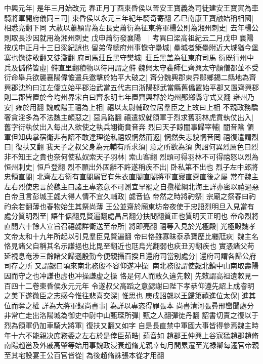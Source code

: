 中興元年|{
	是年三月始改元}
春正月丁酉東昏侯以晉安王寶義為司徒建安王寶寅為車騎將軍開府儀同三司|{
	東昏侯以永元三年紀年騎奇寄翻}
乙巳南康王寶融始稱相國|{
	相悉亮翻下同}
大赦以蕭頴胄為左長史蕭衍為征東將軍楊公則為湘州刺史|{
	去年楊公則取長沙因就用為湘州刺史}
戊申蕭衍發襄陽　|{
	考異曰梁高祖紀云二月戊申襄陽按戊申正月十三日梁紀誤也}
留弟偉總府州事憺守壘城|{
	壘城者築壘附近大城猶今堡寨也憺徒敢翻又徒濫翻}
府司馬莊丘黑守樊城|{
	莊丘黑盖為征東府司馬}
衍既行州中兵及儲偫皆虛|{
	偫直里翻積物以待用謂之偫}
魏興太守裴師仁齊興太守顏僧都並不受衍命舉兵欲襲襄陽偉憺遣兵邀擊於始平大破之|{
	齊分魏興郡東界鄖鄉錫二縣地為齊興郡沈約曰江左僑立始平郡治武當五代志曰浙陽郡武當縣舊僑置始平郡又置齊興郡則二郡皆置於今均州界宋白曰齊永明七年置齊興郡於均州鄖鄉縣守式又翻}
雍州乃安|{
	雍於用翻}
魏咸陽王禧為上相|{
	禧以太尉輔政位居羣臣之上故曰上相}
不親政務驕奢貪淫多為不法魏主頗惡之|{
	惡烏路翻}
禧遣奴就領軍于烈求舊羽林虎賁執仗出入|{
	舊字衍執仗出入每出入欲使之執兵翊衛賁音奔}
烈曰天子諒闇事歸宰輔|{
	闇音陰}
領軍但知典掌宿衛非有詔不敢違理從私禧奴惘然而返|{
	惘然失志貌惘音罔}
禧復遣謂烈曰|{
	復扶又翻}
我天子之叔父身為元輔有所求須|{
	意之所欲為須}
與詔何異烈厲色曰烈非不知王之貴也奈何使私奴索天子羽林|{
	索山客翻}
烈頭可得羽林不可得禧怒以烈為恒州刺史|{
	恒戶登翻}
烈不願出外固辭不許遂稱疾不出|{
	卧私第不出也}
烈子左中郎將忠領直閤|{
	北齊左右衛有直閤屬官有朱衣直閤直閤將軍直寢直齋直後之屬}
常在魏主左右烈使忠言於魏主曰諸王專恣意不可測宜早罷之自攬權綱北海王詳亦密以禧過惡白帝且言彭城王勰大得人情不宜久輔政|{
	勰音協}
帝然之時將礿祭|{
	宗廟之祭春曰礿礿余若翻薄也春物始生其祭尚薄}
王公並齋於廟東坊帝夜使于忠語烈明旦入見當有處分質明烈至|{
	語牛倨翻見賢遍翻處昌呂翻分扶問翻質正也質明天正明也}
帝命烈將直閤六十餘人宣旨召禧勰詳衛送至帝所|{
	將即亮翻}
禧等入見於光極殿|{
	光極殿魏孝文帝太和十九年所起以引見羣臣見賢遍翻}
帝曰恪雖寡昧沗承寶歷比纒尫疢|{
	魏主名恪見諸父自稱其名示謙挹也比毘至翻近也尫烏光翻弱也疢丑刃翻疾也}
實憑諸父苟延視息奄涉三齡諸父歸遜殷勤今便親攝百揆且還府司當别處分|{
	還府司謂各歸公府司存之所}
又謂勰曰頃來南北務殷不容仰遂冲操|{
	南北務殷謂使勰北鎮中山南取壽陽因而守之也冲謙也虚也冲操謙虚之操}
恪是何人而敢久違先敕|{
	先敕謂高祖遺敕見一百四十二卷東昏侯永元元年}
令遂叔父高蹈之意勰謝曰陛下孝恭仰遵先詔上成睿明之美下遂微臣之志感今惟往悲喜交深|{
	惟思也}
庚戌詔勰以王歸第禧進位太保|{
	進其位而奪之權}
詳為大將軍録尚書事|{
	為詳以專恣得罪張本}
尚書清河張彞邢巒聞處分非常亡走出洛陽城為御史中尉中山甄琛所彈|{
	甄之人翻彈徒丹翻}
詔書切責之復以于烈為領軍仍加車騎大將軍|{
	復扶又翻又如字}
自是長直禁中軍國大事皆得參焉魏主時年十六不能親决庶務委之左右於是倖臣茹皓|{
	茹音如}
趙郡王仲興上谷宼猛趙郡趙脩南陽趙邕及外戚高肇等始用事魏政浸衰趙脩尤親幸旬月間累遷至光禄卿每遷官帝親至其宅設宴王公百官皆從|{
	為後趙脩誅張本從才用翻}
